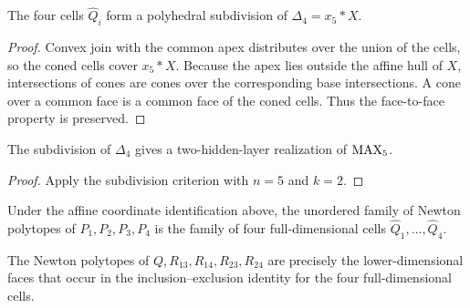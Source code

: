 \begin{lemma}
  \label{lem:delta-four-subdivision}
  The four cells $\widehat Q_i$ form a polyhedral subdivision of
  $\Delta_4=x_5*X$.
\end{lemma}
\begin{proof}
  Convex join with the common apex distributes over the union of the cells,
  so the coned cells cover $x_5*X$.  Because the apex lies outside the affine
  hull of $X$, intersections of cones are cones over the corresponding base
  intersections.  A cone over a common face is a common face of the coned
  cells.  Thus the face-to-face property is preserved.
\end{proof}

\begin{corollary}
  \label{cor:max-five-geometric}
  The subdivision of $\Delta_4$ gives a two-hidden-layer realization of
  $\operatorname{MAX}_5$.
\end{corollary}
\begin{proof}
  Apply the subdivision criterion with $n=5$ and $k=2$.
\end{proof}

\begin{lemma}
  \label{lem:newton-p-cells}
  \notready
  Under the affine coordinate identification above, the unordered family of
  Newton polytopes of $P_1,P_2,P_3,P_4$ is the family of four full-dimensional
  cells $\widehat Q_1,\ldots,\widehat Q_4$.
\end{lemma}

\begin{lemma}
  \label{lem:newton-correction-faces}
  \notready
  The Newton polytopes of $Q,R_{13},R_{14},R_{23},R_{24}$ are precisely the
  lower-dimensional faces that occur in the inclusion--exclusion identity for
  the four full-dimensional cells.
\end{lemma}

